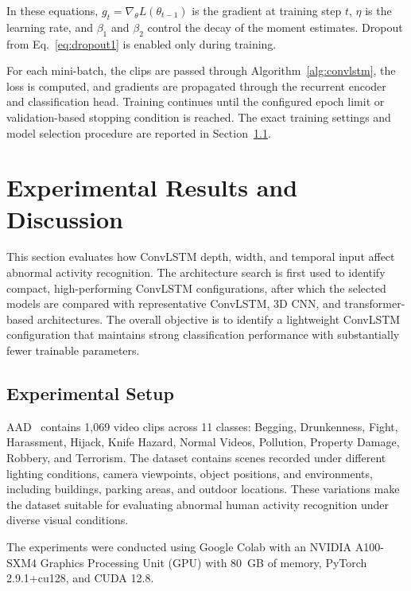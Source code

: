 \documentclass[journal,article,submit,moreauthors]{Definitions/mdpi}
\begin{document}
    In these equations, $g_t=\nabla_\theta L(\theta_{t-1})$ is the 
    gradient at training step $t$, $\eta$ is the learning rate, and 
    $\beta_1$ and $\beta_2$ control the decay of the moment estimates. 
    Dropout from Eq.~\eqref{eq:dropout1} is enabled only during training.

    For each mini-batch, the clips are passed through 
    Algorithm~\ref{alg:convlstm}, the loss is computed, and gradients are
    propagated through the recurrent encoder and classification head. 
    Training continues until the configured epoch limit or validation-based 
    stopping condition is reached. The exact training settings and model 
    selection procedure are reported in Section~\ref{sec:experimental-setup}.

    \section{Experimental Results and Discussion}
    \label{sec:results}

    This section evaluates how ConvLSTM depth, width, and temporal input affect abnormal activity
    recognition. The architecture search is first used to identify compact, high-performing ConvLSTM
    configurations, after which the selected models are compared with representative ConvLSTM, 3D
    CNN, and transformer-based architectures. The overall objective is to identify a lightweight
    ConvLSTM configuration that maintains strong classification performance with substantially
    fewer trainable parameters.

    \subsection{Experimental Setup}
    \label{sec:experimental-setup}

    AAD~\cite{vrskova2022} contains 1,069 video clips across 11
    classes: Begging, Drunkenness, Fight, Harassment, Hijack, Knife Hazard, Normal Videos, 
    Pollution, Property Damage, Robbery, and Terrorism. The dataset contains scenes recorded under
    different lighting conditions, camera viewpoints, object positions, and environments, including
    buildings, parking areas, and outdoor locations. These variations make the dataset suitable for
    evaluating abnormal human activity recognition under diverse visual conditions.

    The experiments were conducted using Google Colab with an NVIDIA A100-SXM4
    Graphics Processing Unit (GPU) with 80~GB of memory, PyTorch 2.9.1+cu128,
    and CUDA 12.8.
\end{document}
